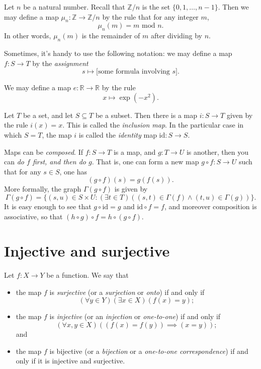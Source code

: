 \documentclass[11pt,dvipsnames]{book}
\def\Z{\mathbb{Z}}
\numberwithin{figure}{section} %
\numberwithin{table}{section} %
\begin{document}
\begin{example}
Let $n$ be a natural number.
Recall that $\Z/n$ is the set $\{0,1,\dots,n-1\}$.
Then we may define a map $\mu_n \colon \Z \to \Z/n$ by the rule that for any integer $m$,
\[
\mu_n(m) = m\mbox{ mod }n.\]
In other words, $\mu_n(m)$ is the remainder of $m$ after dividing by $n$.
\end{example}

Sometimes, it's handy to use the following notation:
we may define a map $ f \colon S \to T $ by the \emph{assignment}
\[
	s \mapsto \text{[some formula involving $s$].}
\]

\begin{example}
We may define a map $ e \colon \mathbb{R} \to \mathbb{R}$ by the rule
\[
x \mapsto \exp(-x^2).
\]
\end{example}

\begin{example}
Let $T$ be a set, and let $S \subseteq T$ be a subset.
Then there is a map $i \colon S \to T$ given by the rule $i(x)=x$.
This is called the \emph{inclusion map}.
In the particular case in which $S=T$, the map $i$ is called the \emph{identity} map $\mathrm{id} \colon S \to S$.
\end{example}

Maps can be \emph{composed}.
If $f\colon S \to T$ is a map, and $g\colon T \to U$ is another, then you can \emph{do $f$ first, and then do $g$}.
That is, one can form a new map $g\circ f\colon S \to U$ such that for any $s\in S$, one has
\[
	(g\circ f)(s)= g(f(s)) .
\]
More formally, the graph $\Gamma(g\circ f)$ is given by
\[
	\Gamma(g\circ f)=\{(s,u)\in S\times U : (\exists t\in T)((s,t)\in\Gamma(f)\wedge(t,u)\in\Gamma(g))\}.
\]
It is easy enough to see that $g\circ\mathrm{id}=g$ and $\mathrm{id}\circ f=f$, and moreover composition is associative, so that $(h\circ g)\circ f=h\circ(g\circ f)$.

\section{Injective and surjective}%
\label{injectivesurjective}

\begin{definition}
Let $f \colon X\rightarrow Y$ be a function. We say that
\begin{itemize}
\item the map $f$ is \emph{surjective} (or a \emph{surjection} or \emph{onto}) if and only if
\[
(\forall y\in Y)(\exists x\in X)(f(x)=y);
\]

\item the map $f$ is \emph{injective} (or an \emph{injection} or \emph{one-to-one}) if and only if
\[
(\forall x,y\in X)((f(x)=f(y)) \implies (x=y));
\]
and

\item the map $f$ is bijective (or a \emph{bijection} or a \emph{one-to-one correspondence}) if and only if it is injective and surjective.
\end{itemize}
\end{definition}
\end{document}
